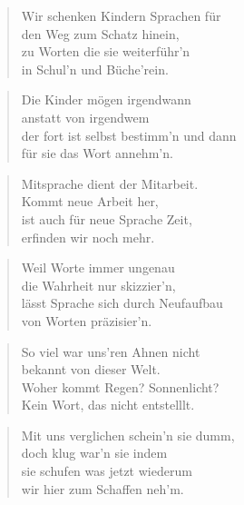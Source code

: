 \documentclass[10pt,a4paper]{article}
\begin{document}
\begin{multicols}{2}
\begin{verse}
Wir schenken Kindern Sprachen für \\
den Weg zum Schatz hinein, \\
zu Worten die sie weiterführ’n \\
in Schul’n und Büche’rein. \\
\end{verse}

\begin{verse}
Die Kinder mögen irgendwann \\
anstatt von irgendwem \\
der fort ist selbst bestimm’n und dann \\
für sie das Wort annehm’n. \\
\end{verse}

\begin{verse}
Mitsprache dient der Mitarbeit. \\
Kommt neue Arbeit her, \\
ist auch für neue Sprache Zeit, \\
erfinden wir noch mehr. \\
\end{verse}

\begin{verse}
Weil Worte immer ungenau \\
die Wahrheit nur skizzier’n, \\
lässt Sprache sich durch Neufaufbau \\
von Worten präzisier’n. \\
\end{verse}

\begin{verse}
So viel war uns’ren Ahnen nicht \\
bekannt von dieser Welt. \\
Woher kommt Regen? Sonnenlicht? \\
Kein Wort, das nicht entstelllt. \\
\end{verse}

\begin{verse}
Mit uns verglichen schein’n sie dumm, \\
doch klug war’n sie indem \\
sie schufen was jetzt wiederum \\
wir hier zum Schaffen neh’m. \\
\end{verse}


\end{multicols}
\end{document}
